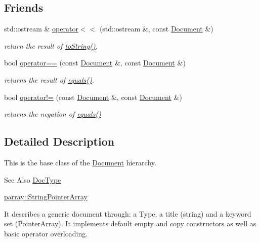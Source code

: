 \subsection*{Friends}
\begin{DoxyCompactItemize}
\item 
std\-::ostream \& \hyperlink{classdocs_1_1Document_a801e6c851261e550881c632d31407c55}{operator$<$$<$} (std\-::ostream \&, const \hyperlink{classdocs_1_1Document}{Document} \&)
\begin{DoxyCompactList}\small\item\em return the result of \hyperlink{classdocs_1_1Document_a16db383045038b779eb489ad125ef02b}{to\-String()}. \end{DoxyCompactList}\item 
bool \hyperlink{classdocs_1_1Document_aba6a95005cddfc7e9b668de3b0160cc6}{operator==} (const \hyperlink{classdocs_1_1Document}{Document} \&, const \hyperlink{classdocs_1_1Document}{Document} \&)
\begin{DoxyCompactList}\small\item\em returns the result of \hyperlink{classdocs_1_1Document_ad86b3a7c7d496f3b05c740e2c1433c78}{equals()}. \end{DoxyCompactList}\item 
bool \hyperlink{classdocs_1_1Document_abda12a8e6c13277b760c0e40efa44695}{operator!=} (const \hyperlink{classdocs_1_1Document}{Document} \&, const \hyperlink{classdocs_1_1Document}{Document} \&)
\begin{DoxyCompactList}\small\item\em returns the negation of \hyperlink{classdocs_1_1Document_ad86b3a7c7d496f3b05c740e2c1433c78}{equals()} \end{DoxyCompactList}\end{DoxyCompactItemize}


\subsection{Detailed Description}
This is the base class of the \hyperlink{classdocs_1_1Document}{Document} hierarchy. 

\begin{DoxySeeAlso}{See Also}
\hyperlink{classdocs_1_1DocType}{Doc\-Type} 

\hyperlink{classparray_1_1StringPointerArray}{parray\-::\-String\-Pointer\-Array}
\end{DoxySeeAlso}
It describes a generic document through\-: a Type, a title (string) and a keyword set (Pointer\-Array). It implements default empty and copy constructors as well as basic operator overloading. 

